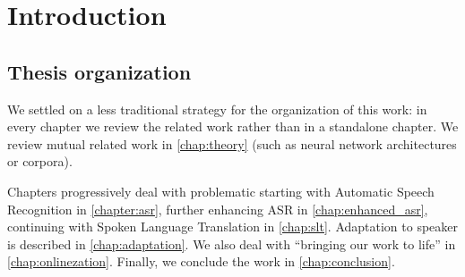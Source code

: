\chapter*{Introduction}

\section*{Thesis organization}
We settled on a less traditional strategy for the organization of this work: in every chapter we review the related work rather than in a standalone chapter. We review mutual related work in \cref{chap:theory} (such as neural network architectures or corpora).

Chapters progressively deal with problematic starting with Automatic Speech Recognition in \cref{chapter:asr}, further enhancing ASR in \cref{chap:enhanced_asr}, continuing with Spoken Language Translation in \cref{chap:slt}. Adaptation to speaker is described in \cref{chap:adaptation}. We also deal with ``bringing our work to life'' in \cref{chap:onlinezation}. Finally, we conclude the work in \cref{chap:conclusion}.
